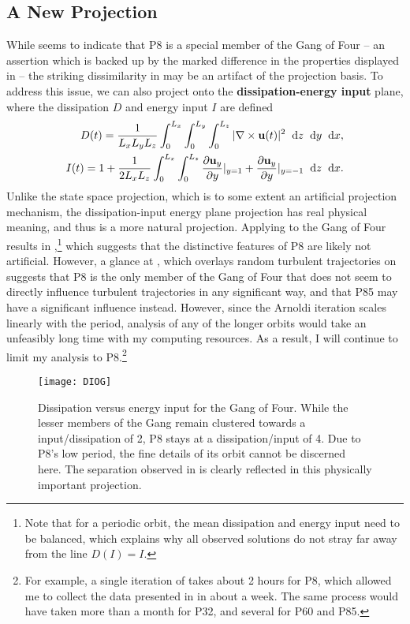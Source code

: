 \subsection{A New Projection}
While  seems to indicate that P8 is a special member of the Gang of Four -- an assertion which is backed up by the marked difference in the properties displayed in  -- the striking dissimilarity in  may be an artifact of the projection basis. To address this issue, we can also project onto the {\bf dissipation-energy input} plane, where the dissipation $D$ and energy input $I$ are defined
\begin{align}
D(t) = \frac{1}{L_xL_yL_z}\int{0}{L_x}{\int{0}{L_y}{\int{0}{L_z}{|\nabla\times\Vector{u}(t)|^2}{\textrm{d}z}}{\textrm{d}y}}{\textrm{d}x},\label{eq:diss}\\
I(t)  = 1 + \frac{1}{2L_xL_z}\int{0}{L_x}{\int{0}{L_z}{\pder{1}{\Vector{u}_{y}}{y} |_{y=1}+\pder{1}{\Vector{u}_{y}}{y} |_{y=-1}}{\textrm{d}z}}{\textrm{d}x}.\label{eq:einp}
\end{align} 
Unlike the state space projection, which is to some extent an artificial projection mechanism, the dissipation-input energy plane projection has real physical meaning, and thus is a more natural projection. Applying  to the Gang of Four results in ,\footnote{Note that for a periodic orbit, the mean dissipation and energy input need to be balanced, which explains why all observed solutions do not stray far away from the line $D(I) = I$.} which suggests that the distinctive features of P8 are likely not artificial. However, a glance at , which overlays random turbulent trajectories on  suggests that P8 is the only member of the Gang of Four that does not seem to directly influence turbulent trajectories in any significant way, and that P85 may have a significant influence instead. However, since the Arnoldi iteration scales linearly with the period, analysis of any of the longer orbits would take an unfeasibly long time with my computing resources. As a result, I will continue to limit my analysis to P8.\footnote{For example, a single iteration of  takes about 2 hours for P8, which allowed me to collect the data presented in  in about a week. The same process would have taken more than a month for P32, and several for P60 and P85.}   
\begin{figure}[h]
\texttt{[image: DIOG]}
\caption{Dissipation versus energy input for the Gang of Four. While the lesser members of the Gang remain clustered towards a input/dissipation of 2, P8 stays at a dissipation/input of 4. Due to P8's low period, the fine details of its orbit cannot be discerned here. The separation observed in  is clearly reflected in this physically important projection.}\label{fig:DIGOF}
\end{figure}

